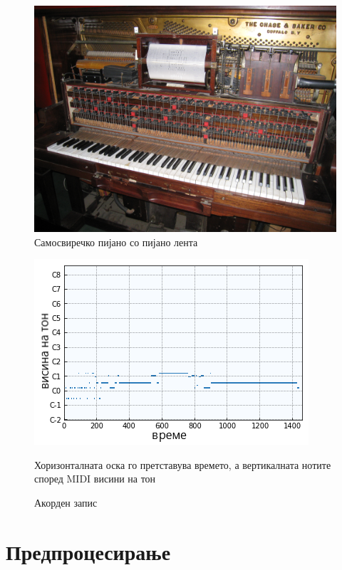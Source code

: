 \begin{figure}[H]
	\centering
\includegraphics[scale=.3]{images/piano.jpeg}
	\caption{Самосвиречко пијано со пијано лента}
	\label{fig:piano_pr}
\end{figure}

\begin{figure}[H]
	\centering
\includegraphics[scale=0.9]{images/piano_roll.png}
	\caption{Акорден запис}
	Хоризонталната оска го претставува времето, а вертикалната нотите според MIDI висини на тон
	\label{fig:piano_roll}
\end{figure}

\section{Предпроцесирање}

